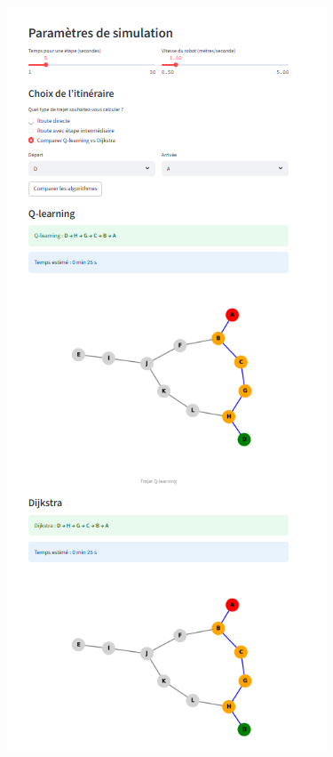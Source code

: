\documentclass{article}
\begin{document}
\begin{figure}[htbp]
  \centering
  \begin{minipage}[b]{0.45\textwidth}
    \centering
    \includegraphics[width=\textwidth]{image6.png}

\end{minipage}
\end{figure}
\end{document}
